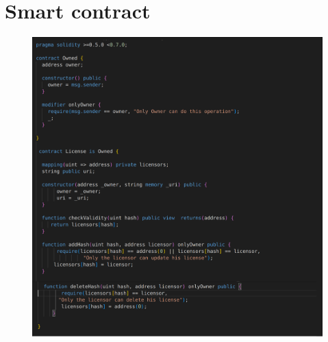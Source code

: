 
\chapter{Smart contract}
\begin{center}
	\begin{figure}[htb!]
		
		\begin{minipage}{0.43\linewidth}
			\centering
			\includegraphics[width=1.95\textwidth]{images/chap03_sc_owner_license.png}
		\end{minipage}
		
	\end{figure}
	
\end{center}